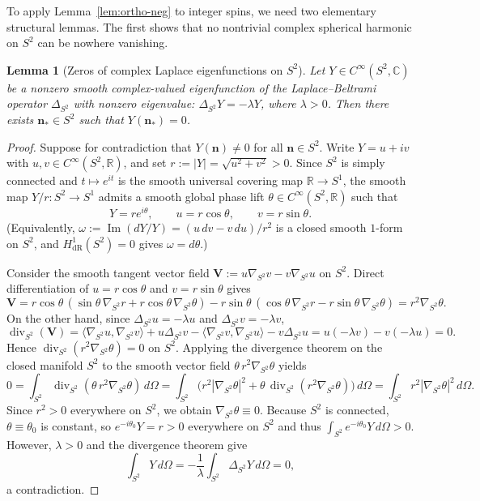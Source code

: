 \documentclass[11pt,a4paper]{article}
\newtheorem{lemma}[theorem]{Lemma}
\theoremstyle{remark}
\newcommand{\divS}{\operatorname{div}_{S^2}}
\newcommand{\gradS}{\nabla_{S^2}}
\newcommand{\LapS}{\Delta_{S^2}}
\newcommand{\bn}{\mathbf{n}}
\begin{document}
To apply Lemma~\ref{lem:ortho-neg} to integer spins, we need two elementary structural lemmas. The first shows that no nontrivial complex spherical harmonic on $S^2$ can be nowhere vanishing.

\begin{lemma}[Zeros of complex Laplace eigenfunctions on $S^2$]\label{lem:complex-sh-zero}
Let $Y \in C^\infty(S^2, \mathbb{C})$ be a nonzero smooth complex-valued eigenfunction of the Laplace--Beltrami operator $\LapS$ with nonzero eigenvalue: $\LapS Y = -\lambda Y$, where $\lambda > 0$. Then there exists $\bn_* \in S^2$ such that $Y(\bn_*) = 0$.
\end{lemma}

\begin{proof}
Suppose for contradiction that $Y(\bn) \neq 0$ for all $\bn \in S^2$. Write $Y = u + iv$ with $u, v \in C^\infty(S^2, \mathbb{R})$, and set $r := |Y| = \sqrt{u^2 + v^2} > 0$. Since $S^2$ is simply connected and $t \mapsto e^{it}$ is the smooth universal covering map $\mathbb{R} \to S^1$, the smooth map $Y/r : S^2 \to S^1$ admits a smooth global phase lift $\theta \in C^\infty(S^2, \mathbb{R})$ such that
\[
Y = r e^{i\theta}, \qquad u = r\cos\theta, \qquad v = r\sin\theta.
\]
(Equivalently, $\omega := \operatorname{Im}(dY/Y) = (u\,dv - v\,du)/r^2$ is a closed smooth $1$-form on $S^2$, and $H^1_{\mathrm{dR}}(S^2) = 0$ gives $\omega = d\theta$.)

Consider the smooth tangent vector field $\mathbf{V} := u\gradS v - v\gradS u$ on $S^2$. Direct differentiation of $u = r\cos\theta$ and $v = r\sin\theta$ gives
\[
\mathbf{V} = r\cos\theta\,(\sin\theta\,\gradS r + r\cos\theta\,\gradS\theta)
           - r\sin\theta\,(\cos\theta\,\gradS r - r\sin\theta\,\gradS\theta)
           = r^2 \gradS\theta.
\]
On the other hand, since $\LapS u = -\lambda u$ and $\LapS v = -\lambda v$,
\[
\divS(\mathbf{V}) = \langle \gradS u, \gradS v \rangle + u\LapS v - \langle \gradS v, \gradS u \rangle - v\LapS u
= u(-\lambda v) - v(-\lambda u) = 0.
\]
Hence $\divS(r^2\gradS\theta) = 0$ on $S^2$. Applying the divergence theorem on the closed manifold $S^2$ to the smooth vector field $\theta\, r^2 \gradS\theta$ yields
\[
0 = \int_{S^2} \divS(\theta\,r^2\gradS\theta)\,d\Omega
  = \int_{S^2} \big(r^2|\gradS\theta|^2 + \theta\,\divS(r^2\gradS\theta)\big)\,d\Omega
  = \int_{S^2} r^2 |\gradS\theta|^2\,d\Omega.
\]
Since $r^2 > 0$ everywhere on $S^2$, we obtain $\gradS\theta \equiv 0$. Because $S^2$ is connected, $\theta \equiv \theta_0$ is constant, so $e^{-i\theta_0} Y = r > 0$ everywhere on $S^2$ and thus $\int_{S^2} e^{-i\theta_0} Y\,d\Omega > 0$. However, $\lambda > 0$ and the divergence theorem give
\[
\int_{S^2} Y\,d\Omega = -\frac{1}{\lambda} \int_{S^2} \LapS Y\,d\Omega = 0,
\]
a contradiction.
\end{proof}
\end{document}
